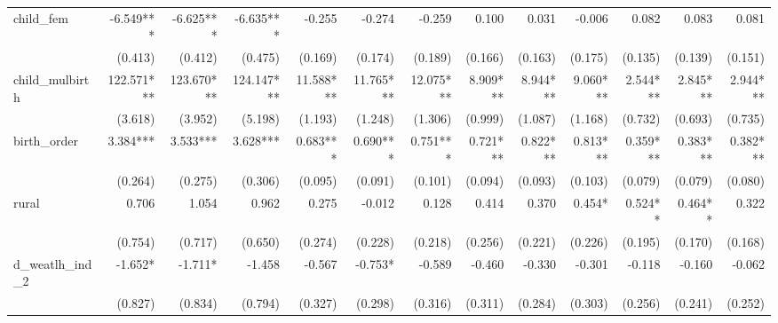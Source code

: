 \begin{tabular}{lrrrrrrrrrrrr}
child\_fem                                  &    -6.549*** &    -6.625*** &    -6.635*** &       -0.255 &       -0.274 &       -0.259 &        0.100 &        0.031 &       -0.006 &        0.082 &        0.083 &        0.081 \\ 
                                            &      (0.413) &      (0.412) &      (0.475) &      (0.169) &      (0.174) &      (0.189) &      (0.166) &      (0.163) &      (0.175) &      (0.135) &      (0.139) &      (0.151) \\ 
child\_mulbirth                             &   122.571*** &   123.670*** &   124.147*** &    11.588*** &    11.765*** &    12.075*** &     8.909*** &     8.944*** &     9.060*** &     2.544*** &     2.845*** &     2.944*** \\ 
                                            &      (3.618) &      (3.952) &      (5.198) &      (1.193) &      (1.248) &      (1.306) &      (0.999) &      (1.087) &      (1.168) &      (0.732) &      (0.693) &      (0.735) \\ 
birth\_order                                &     3.384*** &     3.533*** &     3.628*** &     0.683*** &     0.690*** &     0.751*** &     0.721*** &     0.822*** &     0.813*** &     0.359*** &     0.383*** &     0.382*** \\ 
                                            &      (0.264) &      (0.275) &      (0.306) &      (0.095) &      (0.091) &      (0.101) &      (0.094) &      (0.093) &      (0.103) &      (0.079) &      (0.079) &      (0.080) \\ 
rural                                       &        0.706 &        1.054 &        0.962 &        0.275 &       -0.012 &        0.128 &        0.414 &        0.370 &       0.454* &      0.524** &      0.464** &        0.322 \\ 
                                            &      (0.754) &      (0.717) &      (0.650) &      (0.274) &      (0.228) &      (0.218) &      (0.256) &      (0.221) &      (0.226) &      (0.195) &      (0.170) &      (0.168) \\ 
d\_weatlh\_ind\_2                           &      -1.652* &      -1.711* &       -1.458 &       -0.567 &      -0.753* &       -0.589 &       -0.460 &       -0.330 &       -0.301 &       -0.118 &       -0.160 &       -0.062 \\ 
                                            &      (0.827) &      (0.834) &      (0.794) &      (0.327) &      (0.298) &      (0.316) &      (0.311) &      (0.284) &      (0.303) &      (0.256) &      (0.241) &      (0.252) \\ 

\end{tabular}
